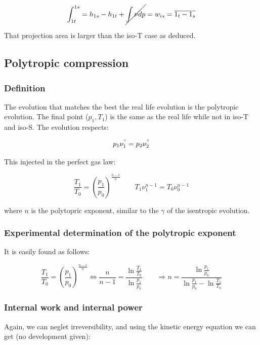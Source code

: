 \begin{equation}
\int _{1t} ^{1s} = h_{1s} - h_{1t} + \cancel{\int \nu dp} = w_{is} = \overline{1_t - 1_s}
\end{equation}

That projection area is larger than the iso-T case as deduced. 

\subsection{Polytropic compression}
\subsubsection{Definition}
The evolution that matches the best the real life evolution is the polytropic evolution. The final point ($p_1,T_1$) is the same as the real life while not in iso-T and iso-S. The evolution respects: 

\begin{equation}
p_1\nu_1^" = p_2\nu _2^"
\end{equation}

This injected in the perfect gas law: 

\begin{equation}
\frac{T_1}{T_0} = \left( \frac{p_1}{p_0}\right)^{\frac{n-1}{n}} \qquad T_1\nu_1^{n-1} = T_0\nu_0^{n-1}
\end{equation}

where $n$ is the polytopric exponent, similar to the $\gamma$ of the isentropic evolution. 

\subsubsection{Experimental determination of the polytropic exponent}
It is easily found as follows: 

\begin{equation}
\frac{T_1}{T_0} = \left( \frac{p_1}{p_0}\right)^{\frac{n-1}{n}} \Leftrightarrow \frac{n}{n-1} = \frac{\ln \frac{T_1}{T_0}}{\ln \frac{p_1}{p_0}} \qquad \Rightarrow n = \frac{\ln \frac{p_1}{p_0}}{\ln \frac{p_1}{p_0} - \ln \frac{T_1}{T_0}}
\end{equation}

\subsubsection{Internal work and internal power}
Again, we can neglet irreversibility, and using the kinetic energy equation we can get (no development given): 

